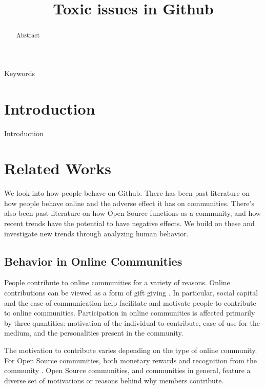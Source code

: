 \documentclass[conference]{IEEEtran}
\begin{document}
\title{Toxic issues in Github\\}

\maketitle

\begin{abstract}
Abstract 
\end{abstract}

\begin{IEEEkeywords}
Keywords 
\end{IEEEkeywords}

\section{Introduction}
Introduction
\section{Related Works}

We look into how people behave on Github. There has been past literature on how people behave online and the adverse effect it has on communities. There's also been past literature on how Open Source functions as a community, and how recent trends have the potential to have negative effects. We build on these and investigate new trends through analyzing human behavior. 

\subsection{Behavior in Online Communities} 

People contribute to online communities for a variety of reasons. Online contributions can be viewed as a form of gift giving \cite{wang2003assessing}. In particular, social capital and the ease of communication help facilitate and motivate people to contribute to online communities. Participation in online communities is affected primarily by three quantities: motivation of the individual to contribute, ease of use for the medium, and the personalities present in the community. 

The motivation to contribute varies depending on the type of online community. For Open Source communities, both monetary rewards and recognition from the community \cite{antikainen2010rewarding}. Open Source communities, and communities in general, feature a diverse set of motivations or reasons behind why members contribute. 
\end{document}

